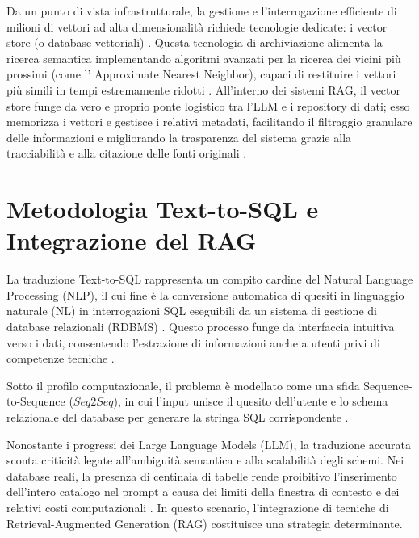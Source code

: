 Da un punto di vista infrastrutturale, la gestione e l'interrogazione
efficiente di milioni di vettori ad alta dimensionalità richiede
tecnologie dedicate: i vector store (o database vettoriali) \cite{thinkia2025vectordatabases,
enwiki:1360040196}. Questa tecnologia di archiviazione alimenta la ricerca
semantica implementando algoritmi avanzati per la ricerca dei vicini più
prossimi (come l' Approximate Nearest Neighbor), capaci di
restituire i vettori più simili in tempi estremamente ridotti \cite{khalusova2024understanding,
enwiki:1360040196}. All'interno dei sistemi RAG, il vector store funge da vero e
proprio ponte logistico tra l'LLM e i repository di dati; esso memorizza
i vettori e gestisce i relativi metadati, facilitando il filtraggio
granulare delle informazioni e migliorando la trasparenza del sistema
grazie alla tracciabilità e alla citazione delle fonti originali
\cite{thinkia2025vectordatabases, enwiki:1360040196}.

\section{Metodologia Text-to-SQL e Integrazione del
RAG}\label{metodologia-text-to-sql-e-integrazione-del-rag}

La traduzione Text-to-SQL rappresenta un compito cardine del
Natural Language Processing (NLP), il cui fine è la conversione
automatica di quesiti in linguaggio naturale (NL) in interrogazioni
SQL eseguibili da un sistema
di gestione di database relazionali (RDBMS) \cite{hong2025nextgenerationdatabaseinterfacessurvey, kanburoglu2024text}. Questo
processo funge da interfaccia intuitiva verso i dati, consentendo l'estrazione di
informazioni anche a utenti privi di competenze tecniche \cite{lei-etal-2020-examining, xia2024r3thissqlme,
hong2025nextgenerationdatabaseinterfacessurvey}.

Sotto il profilo computazionale, il problema è modellato come una sfida
Sequence-to-Sequence (\(Seq2Seq\)), in cui l'input unisce il
quesito dell'utente e lo schema relazionale del database per generare la
stringa SQL corrispondente \cite{xia2024r3thissqlme, kanburoglu2024text}.

Nonostante i progressi dei Large Language Models (LLM), la
traduzione accurata sconta criticità legate all'ambiguità semantica e
alla scalabilità degli schemi. Nei database reali, la presenza di
centinaia di tabelle rende proibitivo l'inserimento dell'intero catalogo
nel prompt a causa dei limiti della finestra di contesto e dei relativi costi computazionali \cite{hong2025nextgenerationdatabaseinterfacessurvey}. In questo
scenario, l'integrazione di tecniche di Retrieval-Augmented
Generation (RAG) costituisce una strategia determinante.

